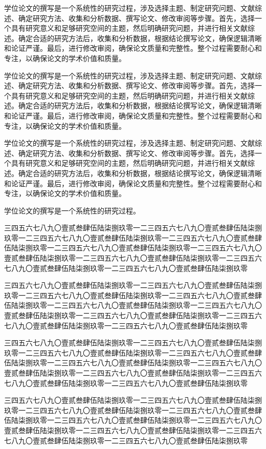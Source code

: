 \documentclass[master,academic]{ysuthesis} %
\begin{document}
		学位论文的撰写是一个系统性的研究过程，涉及选择主题、制定研究问题、文献综述、确定研究方法、收集和分析数据、撰写论文、修改审阅等步骤。首先，选择一个具有研究意义和足够研究空间的主题，然后明确研究问题，并进行相关文献综述。确定合适的研究方法后，收集和分析数据，根据结论撰写论文，确保逻辑清晰和论证严谨。最后，进行修改审阅，确保论文质量和完整性。整个过程需要耐心和专注，以确保论文的学术价值和质量。

		学位论文的撰写是一个系统性的研究过程，涉及选择主题、制定研究问题、文献综述、确定研究方法、收集和分析数据、撰写论文、修改审阅等步骤。首先，选择一个具有研究意义和足够研究空间的主题，然后明确研究问题，并进行相关文献综述。确定合适的研究方法后，收集和分析数据，根据结论撰写论文，确保逻辑清晰和论证严谨。最后，进行修改审阅，确保论文质量和完整性。整个过程需要耐心和专注，以确保论文的学术价值和质量。

		学位论文的撰写是一个系统性的研究过程，涉及选择主题、制定研究问题、文献综述、确定研究方法、收集和分析数据、撰写论文、修改审阅等步骤。首先，选择一个具有研究意义和足够研究空间的主题，然后明确研究问题，并进行相关文献综述。确定合适的研究方法后，收集和分析数据，根据结论撰写论文，确保逻辑清晰和论证严谨。最后，进行修改审阅，确保论文质量和完整性。整个过程需要耐心和专注，以确保论文的学术价值和质量。

		学位论文的撰写是一个系统性的研究过程。

		三四五六七八九〇壹贰叁肆伍陆柒捌玖零一二三四五六七八九〇壹贰叁肆伍陆柒捌玖零一二三四五六七八九〇壹贰叁肆伍陆柒捌玖零一二三四五六七八九〇壹贰叁肆伍陆柒捌玖零一二三四五六七八九〇壹贰叁肆伍陆柒捌玖零一二三四五六七八九〇壹贰叁肆伍陆柒捌玖零一二三四五六七八九〇壹贰叁肆伍陆柒捌玖零一二三四五六七八九〇壹贰叁肆伍陆柒捌玖零一二三四五六七八九〇壹贰叁肆伍陆柒捌玖零

		三四五六七八九〇壹贰叁肆伍陆柒捌玖零一二三四五六七八九〇壹贰叁肆伍陆柒捌玖零一二三四五六七八九〇壹贰叁肆伍陆柒捌玖零一二三四五六七八九〇壹贰叁肆伍陆柒捌玖零一二三四五六七八九〇壹贰叁肆伍陆柒捌玖零一二三四五六七八九〇壹贰叁肆伍陆柒捌玖零一二三四五六七八九〇壹贰叁肆伍陆柒捌玖零一二三四五六七八九〇壹贰叁肆伍陆柒捌玖零一二三四五六七八九〇壹贰叁肆伍陆柒捌玖零

		三四五六七八九〇壹贰叁肆伍陆柒捌玖零一二三四五六七八九〇壹贰叁肆伍陆柒捌玖零一二三四五六七八九〇壹贰叁肆伍陆柒捌玖零一二三四五六七八九〇壹贰叁肆伍陆柒捌玖零一二三四五六七八九〇壹贰叁肆伍陆柒捌玖零一二三四五六七八九〇壹贰叁肆伍陆柒捌玖零一二三四五六七八九〇壹贰叁肆伍陆柒捌玖零一二三四五六七八九〇壹贰叁肆伍陆柒捌玖零一二三四五六七八九〇壹贰叁肆伍陆柒捌玖零

		三四五六七八九〇壹贰叁肆伍陆柒捌玖零一二三四五六七八九〇壹贰叁肆伍陆柒捌玖零一二三四五六七八九〇壹贰叁肆伍陆柒捌玖零一二三四五六七八九〇壹贰叁肆伍陆柒捌玖零一二三四五六七八九〇壹贰叁肆伍陆柒捌玖零一二三四五六七八九〇壹贰叁肆伍陆柒捌玖零一二三四五六七八九〇壹贰叁肆伍陆柒捌玖零一二三四五六七八九〇壹贰叁肆伍陆柒捌玖零一二三四五六七八九〇壹贰叁肆伍陆柒捌玖零
\end{document}
